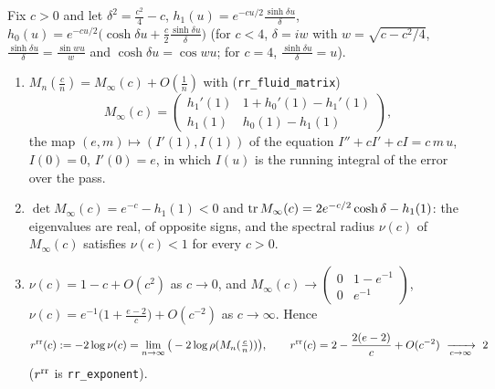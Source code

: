 \begin{proposition}\label{prop:B4-fluid}
Fix $c>0$ and let $\delta^2=\frac{c^2}4-c$, $h_1(u)=e^{-cu/2}\frac{\sinh\delta u}\delta$, $h_0(u)=e^{-cu/2}\big(\cosh\delta u+\frac c2\frac{\sinh\delta u}\delta\big)$ (for $c<4$, $\delta=iw$ with $w=\sqrt{c-c^2/4}$, $\frac{\sinh\delta u}\delta=\frac{\sin wu}w$ and $\cosh\delta u=\cos wu$; for $c=4$, $\frac{\sinh\delta u}{\delta}=u$).
\begin{enumerate}[label=(\roman*)]
\item $M_n(\frac cn)=M_\infty(c)+O(\frac1n)$ with (\texttt{rr\_fluid\_matrix})
\begin{equation}\label{eq:B4-fluid}
M_\infty(c)=\begin{pmatrix}h_1'(1)&1+h_0'(1)-h_1'(1)\\ h_1(1)&h_0(1)-h_1(1)\end{pmatrix},
\end{equation}
the map $(e,m)\mapsto(I'(1),I(1))$ of the equation $I''+cI'+cI=c\,m\,u$, $I(0)=0$, $I'(0)=e$, in which $I(u)$ is the running integral of the error over the pass.
\item $\det M_\infty(c)=e^{-c}-h_1(1)<0$ and $\operatorname{tr} M_\infty(c)=2e^{-c/2}\cosh\delta-h_1(1)$: the eigenvalues are real, of opposite signs, and the spectral radius $\nu(c)$ of $M_\infty(c)$ satisfies $\nu(c)<1$ for every $c>0$.
\item $\nu(c)=1-c+O(c^2)$ as $c\to0$, and $M_\infty(c)\to\begin{pmatrix}0&1-e^{-1}\\0&e^{-1}\end{pmatrix}$, $\nu(c)=e^{-1}\big(1+\frac{e-2}c\big)+O(c^{-2})$ as $c\to\infty$. Hence
\[
r^{\rm rr}(c):=-2\log\nu(c)=\lim_{n\to\infty}\big(-2\log\rho(M_n(\tfrac cn))\big),\qquad r^{\rm rr}(c)=2-\frac{2(e-2)}c+O(c^{-2})\ \xrightarrow[c\to\infty]{}\ 2
\]
($r^{\rm rr}$ is \texttt{rr\_exponent}).
\end{enumerate}
\end{proposition}
